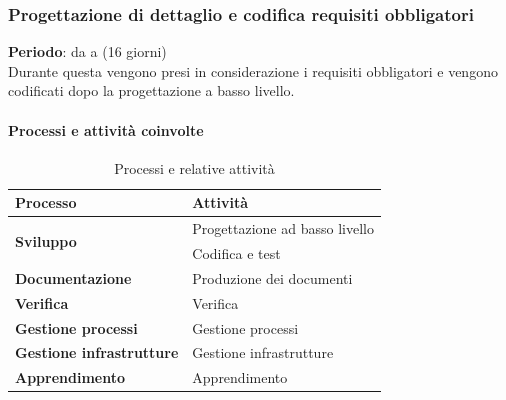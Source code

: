 	\subsubsection {Progettazione di dettaglio e codifica requisiti obbligatori}
		\textbf{Periodo}: da  a  (16 giorni)\\
		Durante questa  vengono presi in considerazione i requisiti obbligatori e vengono codificati dopo la progettazione a basso livello.
		\paragraph{Processi e attività coinvolte}
			\begin{table}[H]
				\centering
				\begin{tabular}{ll}
					\toprule
					\textbf{Processo}                           & \textbf{Attività}              \\
					\midrule
					\multirow{2}{*}{\textbf{Sviluppo}}          & Progettazione ad basso livello \\
					& Codifica e test \\
					\midrule
					\textbf{Documentazione}            & Produzione dei documenti       \\
					\midrule
					\textbf{Verifica}                  & Verifica                       \\
					\midrule
					\textbf{Gestione processi} 					& Gestione processi              \\
					\midrule
					\textbf{Gestione infrastrutture}				& Gestione infrastrutture        \\
					\midrule
					\textbf{Apprendimento} 						& Apprendimento                 \\
					\bottomrule
				\end{tabular}
				\caption{Processi e relative attività}
				\label{Pdrob-ProcessiAttività}
			\end{table}
